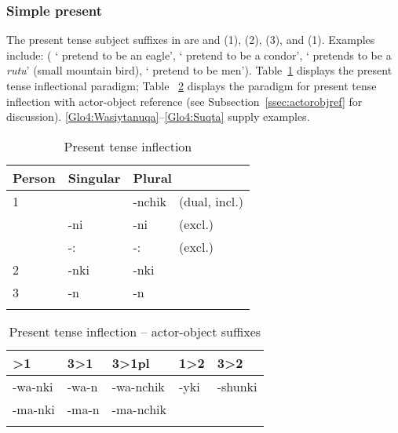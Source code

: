 \subsubsection{Simple present}\label{ssec:simplepresent}
The present tense subject suffixes in \SYQ{} are  and \phono{-:} (1),  (2),  (3), and  (1). Examples include: ( ‘ pretend to be an eagle’,  ‘ pretend to be a condor’,  ‘ pretends to be a \emph{rutu}’ (small mountain bird),  ‘ pretend to be men’). Table~\ref{Tab16a} displays the present tense inflectional paradigm; Table ~\ref{Tab16b} displays the paradigm for present tense inflection with actor-object reference (see Subsection~\ref{ssec:actorobjref} for discussion). \ref{Glo4:Wasiytanuqa}--\ref{Glo4:Suqta} supply examples.

\begin{table}
\small\centering
\caption{Present tense inflection}\label{Tab16a}
\begin{tabular}{llll}
\lsptoprule
Person	& Singular				& \multicolumn{2}{l}{Plural}	\\
\midrule
1		& 						&-nchik				&(dual, incl.)	\\
		&-ni\tss{\AMV,\LT}		&-ni\tss{\AMV,\LT}				&(excl.)		\\
					&-:\tss{\ACH,\CH,\SP}	&-:\tss{\ACH,\CH,\SP}				&(excl.)		\\[2ex]
2		&-nki					&-nki			&\\[2ex]
3		&-n						&-n				&\\
\lspbottomrule
\end{tabular}
\end{table}

\begin{table}
\small\centering
\caption{Present tense inflection -- actor-object suffixes}\label{Tab16b}
\begin{tabular}{lllll}
\lsptoprule
2>1	&	3>1	&	3>1pl	&	1>2	&	3>2	\\
\midrule
-wa-nki\tss{\AMV,\LT}	
&	-wa-n\tss{\AMV,\LT}	
&	-wa-nchik\tss{\AMV,\LT}	
&	-yki	
&	-shunki	\\
-ma-nki\tss{\ACH,\CH,\SP}	
&	-ma-n\tss{\ACH,\CH,\SP}	
&	-ma-nchik\tss{\ACH,\CH,\SP}	
&	 	&	 	\\
\lspbottomrule
\end{tabular}
\end{table}

